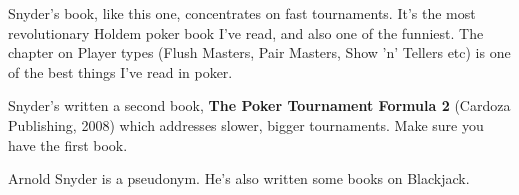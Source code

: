 Snyder's book, like this one, concentrates on fast tournaments. It's
the most revolutionary Holdem poker book I've read, and also one of
the funniest. The chapter on Player types (Flush Masters, Pair Masters,
Show 'n' Tellers etc) is one of the best things I've read in poker.

Snyder's written a second book, \textbf{The Poker Tournament Formula 2}
(Cardoza Publishing, 2008) which addresses slower, bigger
tournaments. Make sure you have the first book.

Arnold Snyder is a pseudonym. He's also written some books on Blackjack.
